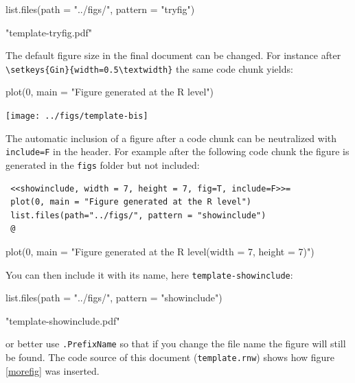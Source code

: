 \documentclass{article}
\begin{document}
\begin{Schunk}
\begin{Sinput}
 list.files(path = "../figs/", pattern = "tryfig")
\end{Sinput}
\begin{Soutput}
[1] "template-tryfig.pdf"
\end{Soutput}
\end{Schunk}

The default figure size in the final document can be changed.
For instance after \verb!\setkeys{Gin}{width=0.5\textwidth}!
the same code chunk yields:

\begin{Schunk}
\begin{Sinput}
 plot(0, main = "Figure generated at the R level")
\end{Sinput}
\end{Schunk}
\texttt{[image: ../figs/template-bis]}

The automatic inclusion of a figure after a code chunk can
be neutralized with \verb!include=F! in the header. For
example after the following code chunk the figure is generated
in the \texttt{figs} folder but not included:

\begin{verbatim}
 <<showinclude, width = 7, height = 7, fig=T, include=F>>=
 plot(0, main = "Figure generated at the R level")
 list.files(path="../figs/", pattern = "showinclude")
 @
\end{verbatim}

\begin{Schunk}
\begin{Sinput}
 plot(0, main = "Figure generated at the R level\n (width = 7, height = 7)")
\end{Sinput}
\end{Schunk}

You can then include it with its name, here \texttt{template-showinclude}:

\begin{Schunk}
\begin{Sinput}
 list.files(path = "../figs/", pattern = "showinclude")
\end{Sinput}
\begin{Soutput}
[1] "template-showinclude.pdf"
\end{Soutput}
\end{Schunk}

or better use \texttt{.PrefixName} so that if you change the file
name the figure will still be found. The code source of this
document (\texttt{template.rnw})
shows how figure \ref{morefig} was inserted.
\end{document}
